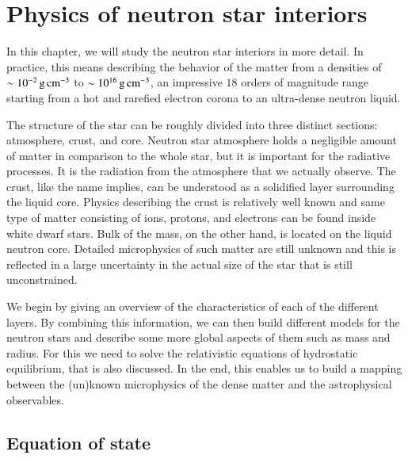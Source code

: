 \chapter{Physics of neutron star interiors} 
In this chapter, we will study the neutron star interiors in more detail.
In practice, this means describing the behavior of the matter from a densities of $\sim 10^{-2} \, \mathrm{g}\,\mathrm{cm}^{-3}$ to $\sim 10^{16} \, \mathrm{g}\,\mathrm{cm}^{-3}$, an impressive $18$ orders of magnitude range starting from a hot and rarefied electron corona to an ultra-dense neutron liquid.

The structure of the star can be roughly divided into three distinct sections: atmosphere, crust, and core.
Neutron star atmosphere holds a negligible amount of matter in comparison to the whole star, but it is important for the radiative processes.
It is the radiation from the atmosphere that we actually observe.
The crust, like the name implies, can be understood as a solidified layer surrounding the liquid core.
Physics describing the crust is relatively well known and same type of matter consisting of ions, protons, and electrons can be found inside white dwarf stars.
Bulk of the mass, on the other hand, is located on the liquid neutron core.
Detailed microphysics of such matter are still unknown and this is reflected in a large uncertainty in the actual size of the star that is still unconstrained.

We begin by giving an overview of the characteristics of each of the different layers.
By combining this information, we can then build different models for the neutron stars and describe some more global aspects of them such as mass and radius.
For this we need to solve the relativistic equations of hydrostatic equilibrium, that is also discussed.
In the end, this enables us to build a mapping between the (un)known microphysics of the dense matter and the astrophysical observables.


\section{Equation of state}
%
%
%
%

